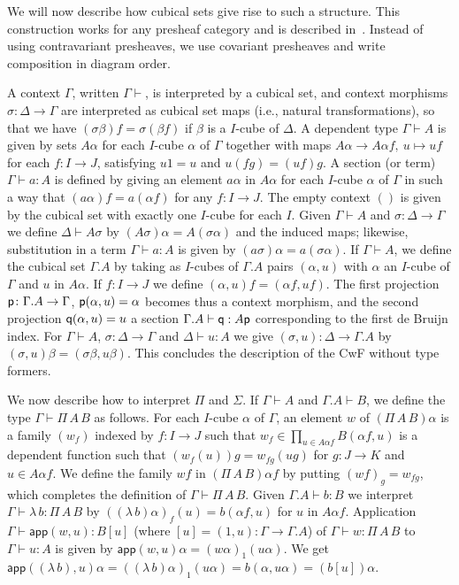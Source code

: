 \documentclass[10pt,a4paper]{article}
\newcommand{\app}{\mathsf{app}}
\newcommand{\pp}{{\sf p}}
\newcommand{\qq}{{\sf q}}
\begin{document}
We will now describe how cubical sets give rise to such a structure.
This construction works for any presheaf category and is described
in~\cite[Sec.~4]{Hofmann}.  Instead of using contravariant presheaves,
we use covariant presheaves and write composition in diagram order.

A context $\Gamma$, written $\Gamma \vdash$, is interpreted by a
cubical set, and context morphisms $\sigma:\Delta\to\Gamma$ are
interpreted as cubical set maps (i.e., natural transformations), so
that we have $(\sigma\beta)f = \sigma(\beta f)$ if $\beta$ is a
$I$-cube of $\Delta$.  A dependent type $\Gamma\vdash A$ is given by
sets $A\alpha$ for each $I$-cube $\alpha$ of $\Gamma$ together with
maps $A\alpha\to A\alpha f,~u\longmapsto uf$ for each $f \colon I \to
J$, satisfying $u1 = u$ and $u(fg) = (uf)g$.  A section (or term)
$\Gamma\vdash a:A$ is defined by giving an element $a\alpha$ in
$A\alpha$ for each $I$-cube $\alpha$ of $\Gamma$ in such a way that
$(a\alpha) f = a (\alpha f)$ for any $f \colon I \to J$.  The empty
context $()$ is given by the cubical set with exactly one $I$-cube for
each $I$.  Given $\Gamma \vdash A$ and $\sigma \colon \Delta \to
\Gamma$ we define $\Delta \vdash A \sigma$ by $(A \sigma) \alpha = A
(\sigma \alpha)$ and the induced maps; likewise, substitution in a
term $\Gamma \vdash a : A$ is given by $(a \sigma) \alpha = a (\sigma
\alpha)$.  If $\Gamma\vdash A$, we define the cubical set $\Gamma.A$
by taking as $I$-cubes of $\Gamma.A$ pairs $(\alpha,u)$ with $\alpha$
an $I$-cube of $\Gamma$ and $u$ in $A\alpha$. If $f:I\to J$ we define
$(\alpha,u)f = (\alpha f,u f)$.  The first projection $\pp \colon
\Gamma.A \to \Gamma$, $\pp (\alpha, u) = \alpha$ becomes thus a
context morphism, and the second projection $\qq (\alpha, u) = u$ a
section $\Gamma.A \vdash \qq : A \pp$ corresponding to the first de
Bruijn index.  For $\Gamma \vdash A$, $\sigma \colon \Delta \to
\Gamma$ and $\Delta \vdash u : A$ we give $(\sigma, u) \colon \Delta
\to \Gamma.A$ by $(\sigma, u) \beta = (\sigma \beta, u \beta)$.  This
concludes the description of the CwF without type formers.

We now describe how to interpret $\Pi$ and $\Sigma$. If $\Gamma\vdash
A$ and $\Gamma.A\vdash B$, we define the type $\Gamma\vdash \Pi\,A\,B$
as follows.  For each $I$-cube $\alpha$ of $\Gamma$, an element $w$ of
$(\Pi\,A\,B)\alpha$ is a family $(w_f)$ indexed by $f:I\to J$ such
that $w_f \in \prod_{u \in A \alpha f} B (\alpha f, u)$ is a dependent
function such that $(w_f (u)) g = w_{fg} (u g)$ for $g \colon J \to K$
and $u \in A \alpha f$.  We define the family $wf$ in $(\Pi\,A\,B)
\alpha f$ by putting $(wf)_g = w_{fg}$, which completes the definition
of $\Gamma\vdash \Pi\,A\,B$.  Given $\Gamma.A \vdash b : B$ we
interpret $\Gamma \vdash \lambda\,b : \Pi\,A\,B$ by $ ((\lambda\, b)
\alpha)_f (u) = b (\alpha f, u)$ for $u$ in $A \alpha f$.  Application
$\Gamma \vdash \app (w,u) : B [u]$ (where $[u] = (1, u) \colon \Gamma
\to \Gamma.A$) of $\Gamma \vdash w : \Pi\,A\,B$ to $\Gamma \vdash u :
A$ is given by $\app (w, u) \alpha = (w\alpha)_1 (u\alpha)$.  We get
$\app ((\lambda\,b), u) \alpha = ((\lambda\,b) \alpha)_1 (u \alpha) =
b (\alpha, u\alpha) = (b [u]) \alpha$.
\end{document}
